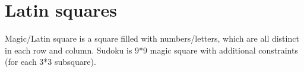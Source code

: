 \section{Latin squares}

Magic/Latin square is a square filled with numbers/letters, which are all distinct in each row and column.
Sudoku is 9*9 magic square with additional constraints (for each 3*3 subsquare).



